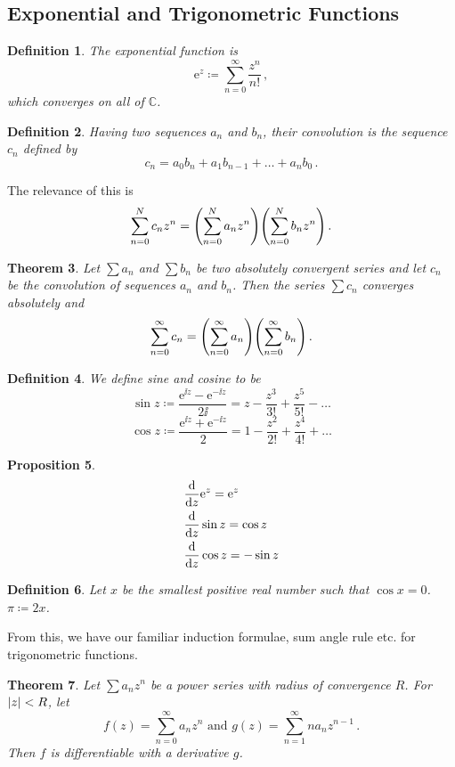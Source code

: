 \documentclass{article}
\theoremstyle{plain}\theoremheaderfont{\normalfont\itshape}\theorembodyfont{\rmfamily}\theoremseparator{.}\newtheorem*{rem}{Remark}\newtheorem*{ex}{Example}\newtheorem*{proof}{Proof}\newtheorem*{altp}{Alternative proof}
\theoremstyle{plain}\theoremheaderfont{\normalfont\bfseries}\theorembodyfont{\rmfamily}\theoremseparator{.}\newtheorem{thm}{Theorem}[section]\newtheorem{lem}[thm]{Lemma}\newtheorem{prop}[thm]{Proposition}\newtheorem*{cor}{Corollary}\newtheorem{defn}[thm]{Definition}\newtheorem{clm}[thm]{Claim}\newtheorem{clminproof}{Claim}
\theoremstyle{break}\theoremheaderfont{\normalfont\itshape}\theorembodyfont{\rmfamily}\theoremseparator{.\medskip}\newtheorem*{proofskip}{Proof}\newtheorem*{exs}{Examples}\newtheorem*{rems}{Remarks}
\theoremstyle{break}\theoremheaderfont{\normalfont\bfseries}\theorembodyfont{\rmfamily}\theoremseparator{.\medskip}\newtheorem{lemskip}[thm]{Lemma}\newtheorem{defnskip}[thm]{Definition}\newtheorem{propskip}[thm]{Proposition}\newtheorem{thmskip}[thm]{Theorem}
\newcommand{\ii}{\mathrm{i}}
\newcommand{\ee}{\mathrm{e}}
\begin{document}
    \subsection{Exponential and Trigonometric Functions}
    \begin{defn}
        The \textit{exponential function} is
        \[\ee^z\coloneqq\sum_{n=0}^{\infty}\frac{z^n}{n!}\,,\]
        which converges on all of \(\mathbb{C}\).
    \end{defn}
    \begin{defn}
        Having two sequences \(a_n\) and \(b_n\), their convolution is the sequence \(c_n\) defined by
        \[c_n=a_0b_n+a_1b_{n-1}+\dots+a_nb_0\,.\]
    \end{defn}
    The relevance of this is
    \[\sum_{n=0}^{N}c_nz^n=\qty(\sum_{n=0}^{N}a_nz^n)\qty(\sum_{n=0}^{N}b_nz^n)\,.\]
    \begin{thm}
        Let \(\sum a_n\) and \(\sum b_n\) be two absolutely convergent series and let \(c_n\) be the convolution of sequences \(a_n\) and \(b_n\). Then the series \(\sum c_n\) converges absolutely and
        \[\sum_{n=0}^{\infty}c_n=\qty(\sum_{n=0}^{\infty}a_n)\qty(\sum_{n=0}^{\infty}b_n)\,.\]
    \end{thm}
    \begin{defn}
        We define \textit{sine} and \textit{cosine} to be
        \[\sin z\coloneqq\frac{\ee^{\ii z}-\ee^{-\ii z}}{2\ii}=z-\frac{z^3}{3!}+\frac{z^5}{5!}-\dots\]
        \[\cos z\coloneqq\frac{\ee^{\ii z}+\ee^{-\ii z}}{2}=1-\frac{z^2}{2!}+\frac{z^4}{4!}+\dots\]
    \end{defn}
    \begin{prop}
        \begin{align*}
            &\dv{z} \ee^z=\ee^z\\
            &\dv{z} \sin z=\cos z\\
            &\dv{z} \cos z=-\sin z
        \end{align*}
    \end{prop}
    \begin{defn}
        Let \(x\) be the smallest positive real number such that \(\cos x=0\). \(\pi\coloneqq 2x\).
    \end{defn}
    From this, we have our familiar induction formulae, sum angle rule etc. for trigonometric functions.
    \begin{thm}
        Let \(\sum a_nz^n\) be a power series with radius of convergence \(R\). For \(\abs{z}<R\), let
        \[f(z)=\sum_{n=0}^{\infty}a_nz^n\text{ and }g(z)=\sum_{n=1}^{\infty}na_nz^{n-1}\,.\]
        Then \(f\) is differentiable with a derivative \(g\).
    \end{thm}
\end{document}
